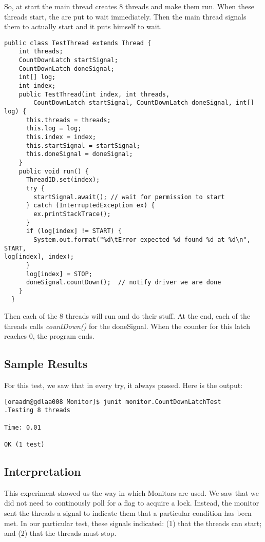 \hfill
\par
So, at start the main thread creates 8 threads and make them run. When these
threads start, the are put to wait immediately. Then the main thread signals
them to actually start and it puts himself to wait.
\par
\hfill
\begin{lstlisting}[style=numbers]
  public class TestThread extends Thread {
    int threads;
    CountDownLatch startSignal;
    CountDownLatch doneSignal;
    int[] log;
    int index;
    public TestThread(int index, int threads,
        CountDownLatch startSignal, CountDownLatch doneSignal, int[] log) {
      this.threads = threads;
      this.log = log;
      this.index = index;
      this.startSignal = startSignal;
      this.doneSignal = doneSignal;
    }
    public void run() {
      ThreadID.set(index);
      try {
        startSignal.await(); // wait for permission to start
      } catch (InterruptedException ex) {
        ex.printStackTrace();
      }
      if (log[index] != START) {
        System.out.format("%d\tError expected %d found %d at %d\n", START,
log[index], index);
      }
      log[index] = STOP;
      doneSignal.countDown();  // notify driver we are done
    }
  }
\end{lstlisting}
\hfill
\par
Then each of the 8 threads will run and do their stuff. At the end, each of  the
threads calls \textit{countDown()} for the doneSignal. When the counter for this
latch reaches 0, the program ends.
\par
\subsection{Sample Results}
\par
For this test, we saw that in every try, it always passed. Here is the output:
\par
\begin{verbatim}
[oraadm@gdlaa008 Monitor]$ junit monitor.CountDownLatchTest
.Testing 8 threads

Time: 0.01

OK (1 test)
\end{verbatim}
\par
\subsection{Interpretation}
This experiment showed us the way in which Monitors are used. We saw that we did
not need to continously poll for a flag to acquire a lock. Instead, the monitor
sent the threads a signal to indicate them that a particular condition has been
met. In our particular test, these signals indicated: (1) that the threads can
start; and (2) that the threads must stop.
